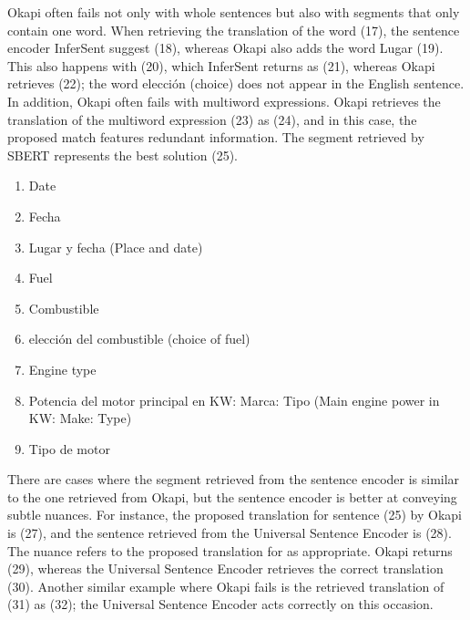 Okapi often fails not only with whole sentences but also with segments that only contain one word. When retrieving the translation of the word (17), the sentence encoder InferSent suggest (18), whereas Okapi also adds the word Lugar (19). This also happens with (20), which InferSent returns as (21), whereas Okapi retrieves (22); the word elección (choice) does not appear in the English sentence. In addition, Okapi often fails with multiword expressions. Okapi retrieves the translation of the multiword expression (23) as (24), and in this case, the proposed match features redundant information. The segment retrieved by SBERT represents the best solution (25).

\begin{enumerate}[resume,label={(\arabic*)}]
		\item	Date
		\item	Fecha
		\item	Lugar y fecha (Place and date)
		\item	Fuel
		\item	Combustible
		\item	elección del combustible (choice of fuel)
		\item	Engine type
		\item	Potencia del motor principal en KW: Marca: Tipo (Main engine power in KW: Make: Type)
		\item	Tipo de motor
	
\end{enumerate}

There are cases where the segment retrieved from the sentence encoder is similar to the one retrieved from Okapi, but the sentence encoder is better at conveying subtle nuances. For instance, the proposed translation for sentence (25) by Okapi is (27), and the sentence retrieved from the Universal Sentence Encoder is (28). The nuance refers to the proposed translation for as appropriate. Okapi returns (29), whereas the Universal Sentence Encoder retrieves the correct translation (30). Another similar example where Okapi fails is the retrieved translation of (31) as (32); the Universal Sentence Encoder acts correctly on this occasion.

